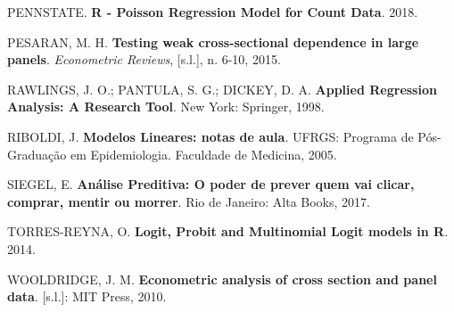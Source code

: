 \documentclass[12pt,brazil,oneside]{book}
\begin{document}
\leavevmode\hypertarget{ref-penn2018}{}%
PENNSTATE. \textbf{R - Poisson Regression Model for Count Data}. 2018.

\leavevmode\hypertarget{ref-pesaran2015}{}%
PESARAN, M. H. \textbf{Testing weak cross-sectional dependence in large panels}. \emph{Econometric Reviews}, {[}s.l.{]}, n. 6-10, 2015.

\leavevmode\hypertarget{ref-Rawlings1998}{}%
RAWLINGS, J. O.; PANTULA, S. G.; DICKEY, D. A. \textbf{Applied Regression Analysis: A Research Tool}. New York: Springer, 1998.

\leavevmode\hypertarget{ref-Riboldi2005}{}%
RIBOLDI, J. \textbf{Modelos Lineares: notas de aula}. UFRGS: Programa de Pós-Graduação em Epidemiologia. Faculdade de Medicina, 2005.

\leavevmode\hypertarget{ref-Siegel2017}{}%
SIEGEL, E. \textbf{Análise Preditiva: O poder de prever quem vai clicar, comprar, mentir ou morrer}. Rio de Janeiro: Alta Books, 2017.

\leavevmode\hypertarget{ref-Torres-Reyna2014}{}%
TORRES-REYNA, O. \textbf{Logit, Probit and Multinomial Logit models in R}. 2014.

\leavevmode\hypertarget{ref-wooldridge2010}{}%
WOOLDRIDGE, J. M. \textbf{Econometric analysis of cross section and panel data}. {[}s.l.{]}: MIT Press, 2010.
\end{document}
